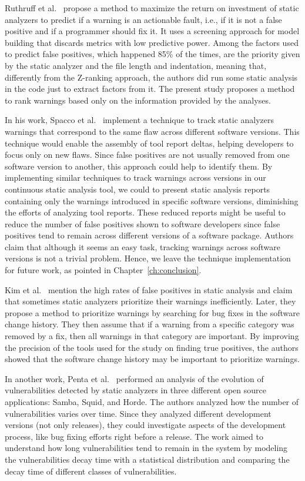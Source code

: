 Ruthruff et al.~\cite{ruthruff_predicting_2008} propose a method to maximize
the return on investment of static analyzers to predict if a warning is an
actionable fault, i.e., if it is not a false positive and if a programmer
should fix it. It uses a screening approach for model building that discards
metrics with low predictive power. Among the factors used to predict false
positives, which happened 85\% of the times, are the priority given by the
static analyzer and the file length and indentation, meaning that, differently
from the Z-ranking approach, the authors did run some static analysis in the
code just to extract factors from it. The present study proposes a method to
rank warnings based only on the information provided by the analyses.

In his work, Spacco et al.~\cite{spacco_tracking_2006} implement a technique
to track static analyzers warnings that correspond to the same flaw across
different software versions. This technique would enable the assembly of tool report
deltas, helping developers to focus only on new flaws. Since false positives
are not usually removed from one software version to another, this approach
could help to identify them. By implementing similar techniques to track
warnings across versions in our continuous static analysis tool, we could to
present static analysis reports containing only the warnings introduced in
specific software versions, diminishing the efforts of analyzing tool reports.
These reduced reports might be useful to reduce the number of false positives shown to software
developers since false positives tend to remain across different versions of a
software package. Authors claim that although it seems an easy task, tracking warnings
across software versions is not a trivial problem. Hence, we leave the technique
implementation for future work, as pointed in Chapter~\ref{ch:conclusion}.

Kim et al.~\cite{kim_which_2007} mention the high rates of false positives in
static analysis and claim that sometimes static analyzers prioritize their
warnings inefficiently. Later, they propose a method to prioritize
warnings by searching for bug fixes in the software change history. They then
assume that if a warning from a specific category was removed by a fix, then
all warnings in that category are important. By improving the precision of the
tools used for the study on finding true positives, the authors showed that the
software change history may be important to prioritize warnings.

In another work, Penta et al.~\cite{penta_evolution_2008} performed an analysis
of the evolution of vulnerabilities detected by static analyzers in three
different open source applications: Samba, Squid, and Horde. The authors
analyzed how the number of vulnerabilities varies over time. Since they
analyzed different development versions (not only releases), they could investigate
aspects of the development process, like bug fixing efforts right before a
release. The work aimed to understand how long vulnerabilities tend
to remain in the system by modeling the vulnerabilities decay time with a
statistical distribution and comparing the decay time of different classes of
vulnerabilities.

